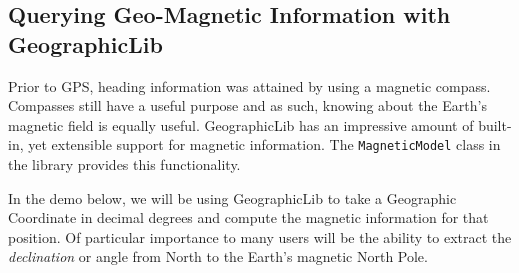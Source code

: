 %
%


\subsection*{Querying Geo-Magnetic Information with GeographicLib }

Prior to GPS, heading information was attained by using a magnetic compass.  Compasses still have a useful purpose and 
as such, knowing about the Earth's magnetic field is equally useful.  GeographicLib has an impressive amount of 
built-in, yet extensible support for magnetic information.  The \texttt{MagneticModel} class in the library provides
this functionality. 

In the demo below, we will be using GeographicLib to take a Geographic Coordinate in decimal degrees
and compute the magnetic information for that position.  Of particular importance to many users will
be the ability to extract the \emph{declination} or angle from North to the Earth's magnetic North Pole.


\inputminted{C++}{../code/chapter6/geographiclib-magnetic-query.cpp}

